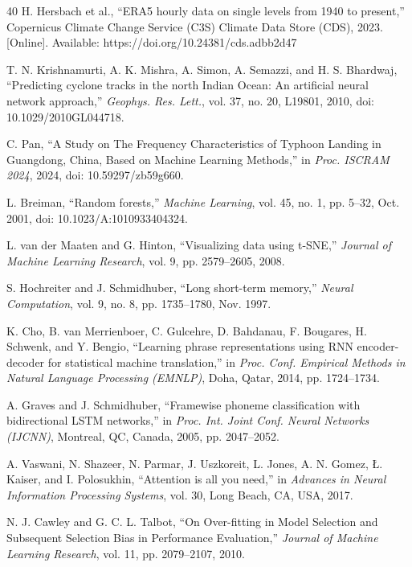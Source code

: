 \documentclass[10pt,twocolumn,a4paper]{article}
\begin{document}
\begin{thebibliography}{40}
H. Hersbach et al., ``ERA5 hourly data on single levels from 1940 to present,'' Copernicus Climate Change Service (C3S) Climate Data Store (CDS), 2023. [Online]. Available: https://doi.org/10.24381/cds.adbb2d47

T. N. Krishnamurti, A. K. Mishra, A. Simon, A. Semazzi, and H. S. Bhardwaj, ``Predicting cyclone tracks in the north Indian Ocean: An artificial neural network approach,'' \textit{Geophys. Res. Lett.}, vol. 37, no. 20, L19801, 2010, doi: 10.1029/2010GL044718.

C. Pan, ``A Study on The Frequency Characteristics of Typhoon Landing in Guangdong, China, Based on Machine Learning Methods,'' in \textit{Proc. ISCRAM 2024}, 2024, doi: 10.59297/zb59g660.

L. Breiman, ``Random forests,'' \textit{Machine Learning}, vol. 45, no. 1, pp. 5--32, Oct. 2001, doi: 10.1023/A:1010933404324.

L. van der Maaten and G. Hinton, ``Visualizing data using t-SNE,'' \textit{Journal of Machine Learning Research}, vol. 9, pp. 2579--2605, 2008.

S. Hochreiter and J. Schmidhuber, ``Long short-term memory,'' \textit{Neural Computation}, vol. 9, no. 8, pp. 1735--1780, Nov. 1997.

K. Cho, B. van Merrienboer, C. Gulcehre, D. Bahdanau, F. Bougares, H. Schwenk, and Y. Bengio, ``Learning phrase representations using RNN encoder-decoder for statistical machine translation,'' in \textit{Proc. Conf. Empirical Methods in Natural Language Processing (EMNLP)}, Doha, Qatar, 2014, pp. 1724--1734.

A. Graves and J. Schmidhuber, ``Framewise phoneme classification with bidirectional LSTM networks,'' in \textit{Proc. Int. Joint Conf. Neural Networks (IJCNN)}, Montreal, QC, Canada, 2005, pp. 2047--2052.

A. Vaswani, N. Shazeer, N. Parmar, J. Uszkoreit, L. Jones, A. N. Gomez, \L. Kaiser, and I. Polosukhin, ``Attention is all you need,'' in \textit{Advances in Neural Information Processing Systems}, vol. 30, Long Beach, CA, USA, 2017.

N. J. Cawley and G. C. L. Talbot, ``On Over-fitting in Model Selection and Subsequent Selection Bias in Performance Evaluation,'' \textit{Journal of Machine Learning Research}, vol. 11, pp. 2079--2107, 2010.


\end{thebibliography}
\end{document}
